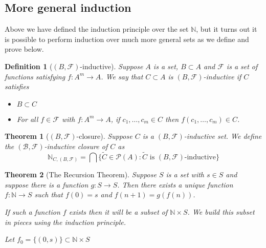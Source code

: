 \documentclass[12pt]{article}
\theoremstyle{break}
\newtheorem{definition}{Definition}[section]
\theoremstyle{break}
\newtheorem{theorem}{Theorem}[section]
\theoremstyle{break}
\theoremstyle{break}
\theoremstyle{break}
\newtheorem{informal definition}[definition]{Informal Definition}
\newcommand{\mc}[1]{\mathcal{#1}}
\begin{document}
\subsection{More general induction}

Above we have defined the induction principle over the set $\mathbb{N}$, but it turns out it is possible to perform induction over much more general sets as we define and prove below.

\begin{definition}[$(B, \mathcal{F})$-inductive]
Suppose $A$ is a set, $B\subset A$ and $\mathcal{F}$ is a set of functions satisfying $f: A^m \to A$.
We say that $C\subset A$ is $(B, \mathcal{F})$-inductive if $C$ satisfies
\begin{itemize}
\item{$B\subset C$}
\item{For all $f\in \mathcal{F}$ with $f:A^m \to A$, if $c_1, \ldots, c_m\in C$ then $f(c_1,\ldots, c_m)\in C$.}
\end{itemize}
\end{definition}

\begin{theorem}[$(B, \mathcal{F})$-closure]
Suppose $C$ is a $(B, \mathcal{F})$-inductive set.
We define the $(\mathcal{B}, \mathcal{F})$-inductive closure of $C$ as
$$
\mathbb{N}_{C, (B, \mathcal{F})} = \bigcap \{\tilde{C}\in\mathcal{P}(A): \tilde{C} \text{ is } (B, \mc{F})\text{-inductive}\}
$$
\end{theorem}

\begin{theorem}[The Recursion Theorem]
Suppose $S$ is a set with $s\in S$ and suppose there is a function $g:S\to S$.
Then there exists a unique function $f:\mathbb{N} \to S$ such that $f(0) = s$ and $f(n+1) = g(f(n))$.

If such a function $f$ exists then it will be a subset of $\mathbb{N} \times S$.
We build this subset in pieces using the induction principle.

Let $f_0 = \{(0, s)\} \subset \mathbb{N}\times S$
\end{theorem}
\end{document}

